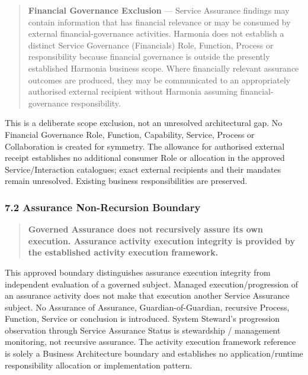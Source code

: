 \begin{quote}

\textbf{Financial Governance Exclusion} — Service Assurance findings may contain information that has financial relevance or may be consumed by external financial-governance activities. Harmonia does not establish a distinct Service Governance (Financials) Role, Function, Process or responsibility because financial governance is outside the presently established Harmonia business scope. Where financially relevant assurance outcomes are produced, they may be communicated to an appropriately authorised external recipient without Harmonia assuming financial-governance responsibility.


\end{quote}
\label{rad:assurance:255}

This is a deliberate scope exclusion, not an unresolved architectural gap. No Financial Governance Role, Function, Capability, Service, Process or Collaboration is created for symmetry. The allowance for authorised external receipt establishes no additional consumer Role or allocation in the approved Service/\allowbreak{}Interaction catalogues; exact external recipients and their mandates remain unresolved. Existing business responsibilities are preserved.

\label{rad:assurance:257}



\label{rad:assurance:259}
\subsubsection*{7.2 Assurance Non-Recursion Boundary}
\label{rad:assurance:261}

\begin{quote}

\textbf{Governed Assurance does not recursively assure its own execution. Assurance activity execution integrity is provided by the established activity execution framework.}


\end{quote}
\label{rad:assurance:263}

This approved boundary distinguishes assurance execution integrity from independent evaluation of a governed subject. Managed execution/\allowbreak{}progression of an assurance activity does not make that execution another Service Assurance subject. No Assurance of Assurance, Guardian-of-Guardian, recursive Process, Function, Service or conclusion is introduced. System Steward's progression observation through Service Assurance Status is stewardship /\allowbreak{} management monitoring, not recursive assurance. The activity execution framework reference is solely a Business Architecture boundary and establishes no application/\allowbreak{}runtime responsibility allocation or implementation pattern.

